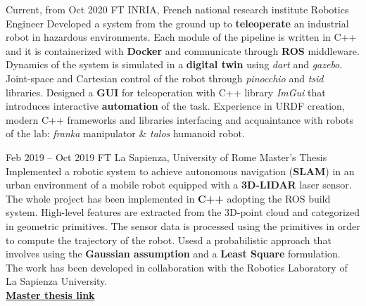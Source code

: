 \documentclass[
	10pt, %
]{../templates/FreemanCV}
\begin{document}
\begin{paracol}{2}


\jobentry
	{Current, from Oct 2020} %
	{FT} %
        {INRIA, French national research institute} %
	{Robotics Engineer} %
	{
          Developed a system from the ground up to \textbf{teleoperate} an industrial robot in hazardous environments.
          Each module of the pipeline is written in C++ and it is containerized with \textbf{Docker} and communicate through \textbf{ROS} middleware.
          Dynamics of the system is simulated in a \textbf{digital twin} using \textit{dart} and \textit{gazebo}.
          Joint-space and Cartesian control of the robot through \textit{pinocchio} and \textit{tsid} libraries.
          Designed a \textbf{GUI} for teleoperation with C++ library \textit{ImGui} that introduces interactive \textbf{automation} of the task.
          Experience in URDF creation, modern C++ frameworks and libraries interfacing and
          acquaintance with robots of the lab: \textit{franka}  manipulator \& \textit{talos} humanoid robot.
        }

\jobentry
	{Feb 2019 -- Oct 2019} %
	{FT} %
	{La Sapienza, University of Rome} %
	{Master's Thesis} %
        {Implemented a robotic system to achieve autonomous navigation (\textbf{SLAM}) in an urban environment of a mobile robot equipped with a \textbf{3D-LIDAR} laser sensor.
         The whole project has been implemented in \textbf{C++} adopting the ROS build system.
         High-level features are extracted from the 3D-point cloud and categorized in geometric primitives.
         The sensor data is processed using the primitives in order to compute the trajectory of the robot.
         Usesd a probabilistic approach that involves using the \textbf{Gaussian assumption} and a \textbf{Least Square} formulation.
         The work has been developed in collaboration with the Robotics Laboratory of La Sapienza University.\\
         \href{https://github.com/dinies/MasterThesis-ArtificialIntelligence-Robotics/blob/master/MaterThesis_Edoardo_Ghini.pdf}{\textbf{Master thesis link}}
         }

         

\end{paracol}
\end{document}
